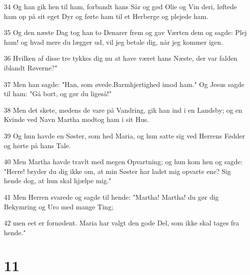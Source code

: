 \par 34 Og han gik hen til ham, forbandt hans Sår og gød Olie og Vin deri, løftede ham op på sit eget Dyr og førte ham til et Herberge og plejede ham.
\par 35 Og den næste Dag tog han to Denarer frem og gav Værten dem og sagde: Plej ham! og hvad mere du lægger ud, vil jeg betale dig, når jeg kommer igen.
\par 36 Hvilken af disse tre tykkes dig nu at have været hans Næste, der var falden iblandt Røverne?"
\par 37 Men han sagde: "Han, som øvede.Barmhjertighed imod ham." Og Jesus sagde til ham: "Gå bort, og gør du ligeså!"
\par 38 Men det skete, medens de vare på Vandring, gik han ind i en Landsby; og en Kvinde ved Navn Martha modtog ham i sit Hus.
\par 39 Og hun havde en Søster, som hed Maria, og hun satte sig ved Herrens Fødder og hørte på hans Tale.
\par 40 Men Martha havde travlt med megen Opvartning; og hun kom hen og sagde: "Herre! bryder du dig ikke om, at min Søster har ladet mig opvarte ene? Sig hende dog, at hun skal hjælpe mig."
\par 41 Men Herren svarede og sagde til hende: "Martha! Martha! du gør dig Bekymring og Uro med mange Ting;
\par 42 men eet er fornødent. Maria har valgt den gode Del, som ikke skal tages fra hende."

\chapter{11}

